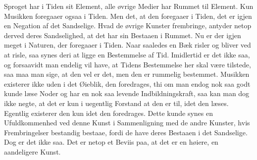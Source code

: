 \documentclass[12pt,a4paper]{article}
\begin{document}
Sproget har i Tiden sit Element, alle øvrige Medier har Rummet til Element. Kun Musikken foregaaer ogsaa i Tiden. Men det, at den foregaaer i Tiden, det er igjen en Negation af det Sandselige. Hvad de øvrige Kunster frembringe, antyder netop derved deres Sandselighed, at det har sin Bestaaen i Rummet. Nu er der igjen meget i Naturen, der foregaaer i Tiden. Naar saaledes en Bæk risler og bliver ved at risle, saa synes deri at ligge en Bestemmelse af Tid. Imidlertid er det ikke saa, og forsaavidt man endelig vil have, at Tidens Bestemmelse her skal være tilstede, saa maa man sige, at den vel er det, men den er rummelig bestemmet. Musikken existerer ikke uden i det Øieblik, den foredrages, thi om man endog nok saa godt kunde læse Noder og har en nok saa levende Indbildningskraft, saa kan man dog ikke negte, at det er kun i uegentlig Forstand at den er til, idet den læses. Egentlig existerer den kun idet den foredrages. Dette kunde synes en Ufuldkommenhed ved denne Kunst i Sammenligning med de andre Kunster, hvis Frembringelser bestandig bestaae, fordi de have deres Bestaaen i det Sandselige. Dog er det ikke saa. Det er netop et Beviis paa, at det er en høiere, en aandeligere Kunst.
\end{document}
